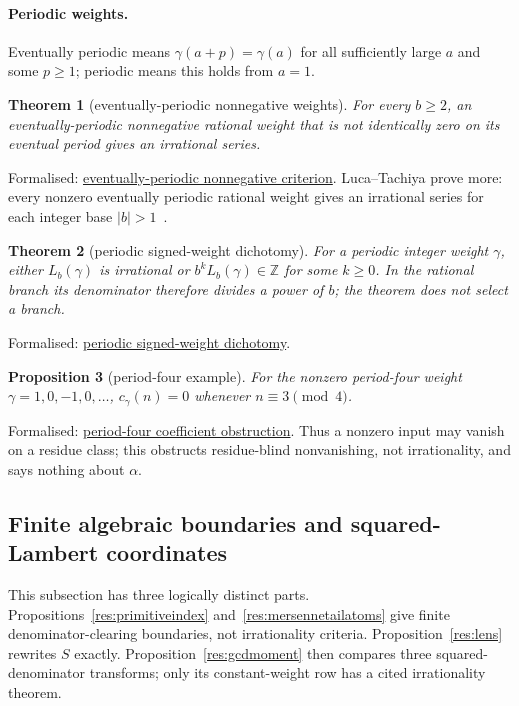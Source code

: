 \documentclass[11pt]{article}
\newcommand{\commit}{312b96c0d149ed466725c62d4ef24cfc91bca34e}
\newcommand{\repobase}{https://github.com/wcook04/plectis-lean-erdos249-257/blob/\commit}
\newcommand{\PK}{Erdos249257}
\newcommand{\lword}[4]{\href{\repobase/\PK/#1\#L#2}{#4}}
\newtheorem{theorem}{Theorem}[section]
\newtheorem{proposition}[theorem]{Proposition}
\theoremstyle{definition}
\theoremstyle{remark}
\newcommand{\Z}{\mathbb{Z}}
\begin{document}
{\paragraph{Periodic weights.}\label{sec:periodicweights}
Eventually periodic means $\gamma(a+p)=\gamma(a)$ for all sufficiently large
$a$ and some $p\geq1$; periodic means this holds from $a=1$.
\begin{theorem}[eventually-periodic nonnegative weights]
\label{res:periodicnonnegative}
For every $b\ge2$, an eventually-periodic nonnegative rational weight that is
not identically zero on its eventual period gives an irrational series.
\end{theorem}
\noindent Formalised:
\lword{CertificateKernel.lean}{12483}{irrational_ratWeightSeries_eventuallyPeriodic}{eventually-periodic nonnegative criterion}.
Luca--Tachiya prove more: every nonzero eventually periodic rational weight
gives an irrational series for each integer base $|b|>1$~\cite{lucatachiya}.
\begin{theorem}[periodic signed-weight dichotomy]\label{res:periodicsigned}
For a periodic integer weight \(\gamma\), either \(L_b(\gamma)\) is irrational
or \(b^kL_b(\gamma)\in\Z\) for some \(k\ge0\).  In the rational branch its
denominator therefore divides a power of \(b\); the theorem does not select a branch.
\end{theorem}
\noindent Formalised:
\lword{CertificateKernel.lean}{13847}{irrational_or_bpow_mul_eq_intCast_intWeightedErdosSeries_periodic}{periodic signed-weight dichotomy}.
\begin{proposition}[period-four example]\label{res:periodfourobstruction}
For the nonzero period-four weight \(\gamma=1,0,-1,0,\ldots\),
$c_\gamma(n)=0$ whenever \(n\equiv3\pmod4\).
\end{proposition}
\noindent Formalised:
\lword{CertificateKernel.lean}{13898}{intWeightedCoeff_periodFourSignWeight_eq_zero_of_mod_four_eq_three}{period-four coefficient obstruction}.
Thus a nonzero input may vanish on a residue class; this obstructs residue-blind
nonvanishing, not irrationality, and says nothing about $\alpha$.

\subsection{Finite algebraic boundaries and squared-Lambert coordinates}
\label{app:lambert-algebraic}

This subsection has three logically distinct parts.  Propositions~\ref{res:primitiveindex}
and~\ref{res:mersennetailatoms} give finite denominator-clearing boundaries,
not irrationality criteria.  Proposition~\ref{res:lens} rewrites $S$ exactly.
Proposition~\ref{res:gcdmoment} then compares three squared-denominator transforms;
only its constant-weight row has a cited irrationality theorem.

}
\end{document}
